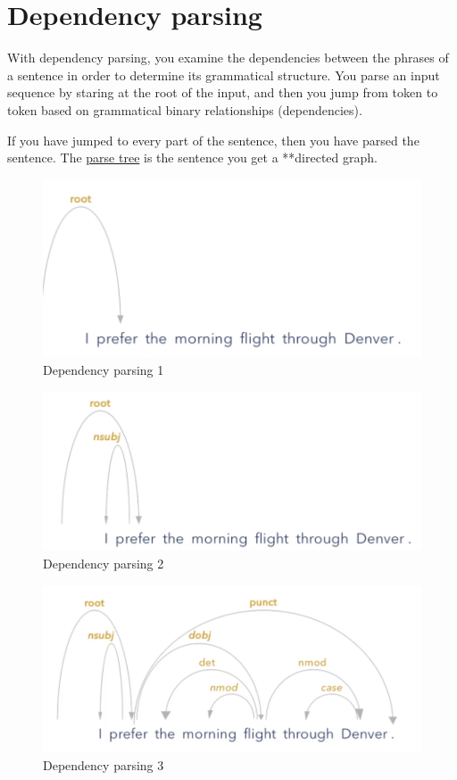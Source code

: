 \documentclass[
  11pt,
  british,
]{article}
\begin{document}
\hypertarget{dependency-parsing}{%
\section{Dependency parsing}\label{dependency-parsing}}

With dependency parsing, you examine the dependencies between the
phrases of a sentence in order to determine its grammatical structure.
You parse an input sequence by staring at the root of the input, and
then you jump from token to token based on grammatical binary
relationships (dependencies).

If you have jumped to every part of the sentence, then you have parsed
the sentence. The \href{Parse\%20Tree.md}{parse tree} is the sentence
you get a **directed graph.

\begin{figure}
\centering
\includegraphics{Pasted_image_20220526224636.png}
\caption{Dependency parsing 1}
\end{figure}

\begin{figure}
\centering
\includegraphics{Pasted_image_20220526224656.png}
\caption{Dependency parsing 2}
\end{figure}

\begin{figure}
\centering
\includegraphics{Pasted_image_20220526224725.png}
\caption{Dependency parsing 3}
\end{figure}
\end{document}
